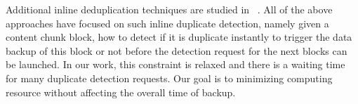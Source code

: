 Additional inline deduplication techniques are studied in ~\cite{sparseindex09,idedup}. All of the above approaches have focused on
such inline duplicate detection, namely given a content chunk block, how to detect if it is duplicate instantly
to trigger the data backup of this block or not before the detection request for the next blocks can be launched. 
In our work, this constraint is relaxed and 
there is a waiting time for many duplicate detection requests. Our goal is to minimizing  computing  resource without
affecting the overall time of backup. 
